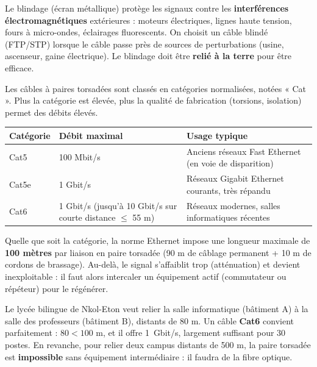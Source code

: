 \documentclass[11pt]{article}
\newcommand{\cle}[1]{{\popxbold\color{popdark}#1}}
\newcounter{popsec}
\newcounter{popsub}
\newcommand{\courssub}[1]{%
  \stepcounter{popsub}%
  \par\vspace{9pt}\noindent{\popxbold\fontsize{11.5}{13}\selectfont\color{popink}{\color{poporange}\thepopsec.\thepopsub}\hspace{6pt}#1}\par\nopagebreak\vspace{4pt}
}
\begin{document}
\begin{propriete}
Le \cle{blindage} (écran métallique) protège les signaux contre les \textbf{interférences électromagnétiques} extérieures : moteurs électriques, lignes haute tension, fours à micro-ondes, éclairages fluorescents. On choisit un câble blindé (FTP/STP) lorsque le câble passe près de sources de perturbations (usine, ascenseur, gaine électrique). Le blindage doit être \textbf{relié à la terre} pour être efficace.
\end{propriete}

\courssub{Catégories, débits et distances}

Les câbles à paires torsadées sont classés en \cle{catégories} normalisées, notées « Cat ». Plus la catégorie est élevée, plus la qualité de fabrication (torsions, isolation) permet des débits élevés.

\begin{center}
\begin{tabularx}{\linewidth}{|l|l|X|}
\hline
\rowcolor{popblueL} \textbf{Catégorie} & \textbf{Débit maximal} & \textbf{Usage typique} \\
\hline
Cat5 & 100 Mbit/s & Anciens réseaux Fast Ethernet (en voie de disparition) \\
\hline
Cat5e & 1 Gbit/s & Réseaux Gigabit Ethernet courants, très répandu \\
\hline
Cat6 & 1 Gbit/s (jusqu'à 10 Gbit/s sur courte distance $\le$ 55 m) & Réseaux modernes, salles informatiques récentes \\
\hline
\end{tabularx}
\end{center}

\begin{aretenir}
Quelle que soit la catégorie, la norme Ethernet impose une longueur maximale de \textbf{100 mètres} par liaison en paire torsadée (90 m de câblage permanent + 10 m de cordons de brassage). Au-delà, le signal s'affaiblit trop (atténuation) et devient inexploitable : il faut alors intercaler un équipement actif (commutateur ou répéteur) pour le régénérer.
\end{aretenir}

\begin{exemplebox}
Le lycée bilingue de Nkol-Eton veut relier la salle informatique (bâtiment A) à la salle des professeurs (bâtiment B), distants de 80 m. Un câble \textbf{Cat6} convient parfaitement : $80 < 100$ m, et il offre \SI{1}{Gbit/s}, largement suffisant pour 30 postes. En revanche, pour relier deux campus distants de 500 m, la paire torsadée est \textbf{impossible} sans équipement intermédiaire : il faudra de la fibre optique.
\end{exemplebox}
\end{document}
